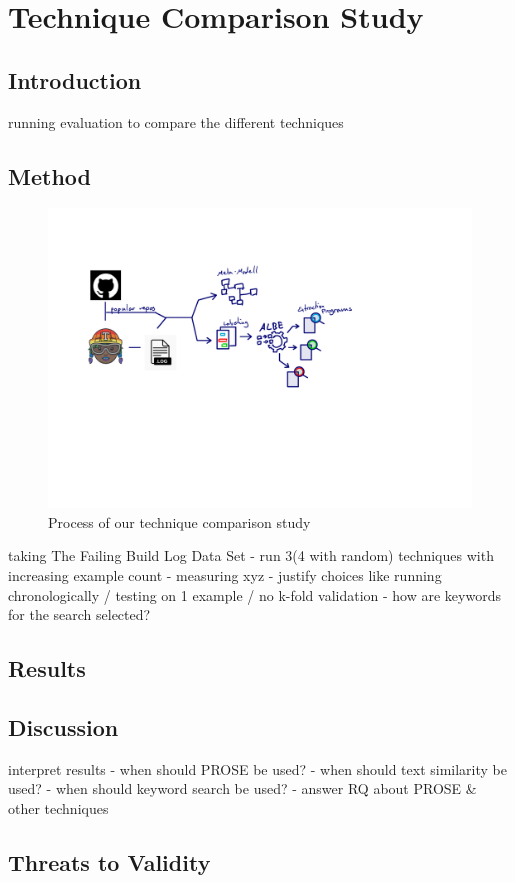 \documentclass[\myrootdir/main.tex]{subfiles}
\begin{document}
\chapter{Technique Comparison Study}
\label{sec:study}
\section{Introduction}
running evaluation to compare the different techniques

\section{Method}
\begin{figure}[h]
	\centering
	\includegraphics[page=6, width=\textwidth, trim={0.5cm 0.5cm 0.5cm 0.5cm}, clip]{img/flow-of-research.pdf}
	\caption{Process of our technique comparison study}
	\label{fig:study}
\end{figure}

taking The Failing Build Log Data Set - run 3(4 with random) techniques with increasing example count - measuring xyz - justify choices like running chronologically / testing on 1 example / no k-fold validation - how are keywords for the search selected?

\section{Results}

\section{Discussion}

interpret results - when should PROSE be used? - when should text similarity be used? - when should keyword search be used? - answer RQ about PROSE \& other techniques
\section{Threats to Validity}
\end{document}
